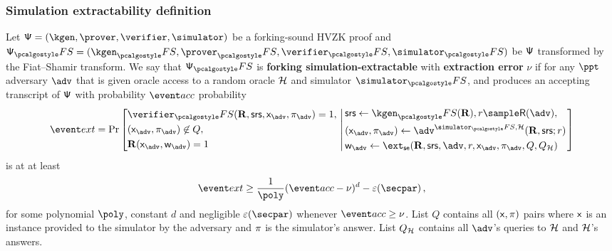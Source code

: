 \documentclass[aspectratio=169]{beamer}
\renewcommand{\emph}[1]{\textbf{#1}}
\begin{document}
\begin{frame}
  \frametitle{Simulation extractability definition}
  \begin{definition}
	\label{def:simext}
	Let $\ps = (\kgen, \prover, \verifier, \simulator)$ be a forking-sound HVZK
  proof and $\ps_\fs = (\kgen_\fs, \prover_\fs, \verifier_\fs, \simulator_\fs)$
  be ${\mathsf{\Psi}}$ transformed by the Fiat--Shamir transform. We say that $\ps_\fs$ is
  \emph{forking simulation-extractable} with \emph{extraction error} $\nu$ if
  for any $\ppt$ adversary $\adv$ that is given oracle access to a random oracle
  $\mathcal{H}$ and simulator $\simulator_\fs$, and produces an accepting transcript of
  ${\mathsf{\Psi}}$ with probability $\accProb$
	probability
	\[
		\extProb = \Pr \left[
		\begin{aligned}
			& \verifier_\fs(\REL, \srs, \inp_{\advse}, \zkproof_{\advse}) = 1,\\
			& (\inp_{\advse}, \zkproof_{\advse}) \not\in Q,\\
			& \REL(\inp_{\advse}, \wit_{\advse}) = 1
		\end{aligned}
		\, \left| \,
		\begin{aligned}
			& \srs \gets \kgen_\fs(\REL), r \sample \RND{\advse},\\
			& (\inp_{\advse}, \zkproof_{\advse}) \gets \advse^{\simulator_\fs,
			\ro} (\REL, \srs; r) \\
			& \wit_{\advse} \gets \ext_\se (\REL, \srs, \advse, r, \inp_{\advse}, \zkproof_{\advse},
			Q, Q_\ro) 
		\end{aligned}
		\right.\right]
	\]
	is at at least 
	\[
		\extProb \geq \frac{1}{\poly} (\accProb - \nu)^d - \eps(\secpar)\,,
	\]
	for some polynomial $\poly$, constant $d$ and negligible $\eps(\secpar)$ whenever
  $\accProb \geq \nu$. List $Q$ contains all $(\mathsf{x}, \pi)$ pairs where
  $\mathsf{x}$ is an instance provided to the simulator by the adversary and
  $\pi$ is the simulator's answer. List $Q_{\mathcal{H}}$ contains all $\advse$'s
  queries to $\mathcal{H}$ and $\mathcal{H}$'s answers.
\end{definition}

\end{frame}
\end{document}
